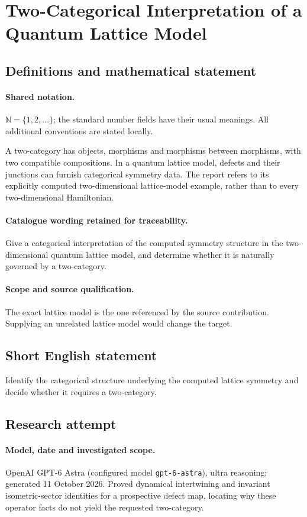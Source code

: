\documentclass[11pt]{article}
\begin{document}
\section{Two-Categorical Interpretation of a Quantum Lattice Model}\label{statement}

\subsection{Definitions and mathematical statement}

\paragraph{Shared notation.}$\mathbb N=\{1,2,\ldots\}$; the standard number fields have their usual meanings. All additional conventions are stated locally.


A two-category has objects, morphisms and morphisms between morphisms, with two compatible compositions. In a quantum lattice model, defects and their junctions can furnish categorical symmetry data. The report refers to its explicitly computed two-dimensional lattice-model example, rather than to every two-dimensional Hamiltonian.

\paragraph{Catalogue wording retained for traceability.}
Give a categorical interpretation of the computed symmetry structure in the two-dimensional quantum lattice model, and determine whether it is naturally governed by a two-category.

\paragraph{Scope and source qualification.}The exact lattice model is the one referenced by the source contribution. Supplying an unrelated lattice model would change the target.
\subsection{Short English statement}
Identify the categorical structure underlying the computed lattice symmetry and decide whether it requires a two-category.
\subsection{Research attempt}
\paragraph{Model, date and investigated scope.}
OpenAI GPT-6 Astra (configured model \texttt{gpt-6-astra}), ultra reasoning; generated 11 October 2026. Proved dynamical intertwining and invariant isometric-sector identities for a prospective defect map, locating why these operator facts do not yield the requested two-category.
\end{document}
